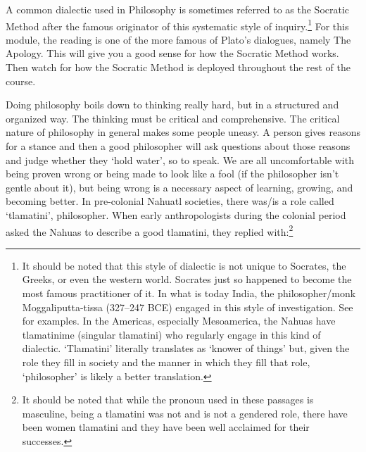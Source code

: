 A common dialectic used in Philosophy is sometimes referred to as the Socratic Method after the famous originator of this systematic style of inquiry.\footnote{It should be noted that this style of dialectic is not unique to Socrates, the Greeks, or even the western world. Socrates just so happened to become the most famous practitioner of it. In what is today India, the philosopher/monk Moggaliputta-tissa (327–247 BCE) engaged in this style of investigation. See  for examples. In the Americas, especially Mesoamerica, the Nahuas have tlamatinime (singular tlamatini) who regularly engage in this kind of dialectic. `Tlamatini' literally translates as `knower of things' but, given the role they fill in society and the manner in which they fill that role, `philosopher' is likely a better translation.} For this module, the reading is one of the more famous of Plato’s dialogues, namely The Apology. This will give you a good sense for how the Socratic Method works. Then watch for how the Socratic Method is deployed throughout the rest of the course.

Doing philosophy boils down to thinking really hard, but in a structured and organized way. The thinking must be critical and comprehensive. The critical nature of philosophy in general makes some people uneasy. A person gives reasons for a stance and then a good philosopher will ask questions about those reasons and judge whether they `hold water', so to speak. We are all uncomfortable with being proven wrong or being made to look like a fool (if the philosopher isn't gentle about it), but being wrong is a necessary aspect of learning, growing, and becoming better. In pre-colonial Nahuatl societies, there was/is a role called `tlamatini', philosopher. When early anthropologists during the colonial period asked the Nahuas to describe a good tlamatini, they replied with:\footnote{It should be noted that while the pronoun used in these passages is masculine, being a tlamatini was not and is not a gendered role, there have been women tlamatini and they have been well acclaimed for their successes.} 

